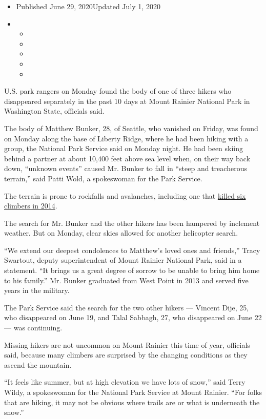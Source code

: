\begin{itemize}
\item
  Published June 29, 2020Updated July 1, 2020
\item
  \begin{itemize}
  \item
  \item
  \item
  \item
  \item
  \end{itemize}
\end{itemize}

U.S. park rangers on Monday found the body of one of three hikers who
disappeared separately in the past 10 days at Mount Rainier National
Park in Washington State, officials said.

The body of Matthew Bunker, 28, of Seattle, who vanished on Friday, was
found on Monday along the base of Liberty Ridge, where he had been
hiking with a group, the National Park Service said on Monday night. He
had been skiing behind a partner at about 10,400 feet above sea level
when, on their way back down, ``unknown events'' caused Mr. Bunker to
fall in ``steep and treacherous terrain,'' said Patti Wold, a
spokeswoman for the Park Service.

The terrain is prone to rockfalls and avalanches, including one that
\href{https://www.nytimes.com/2014/06/02/us/six-climbers-are-missing-on-mount-rainier.html}{killed
six climbers in 2014}.

The search for Mr. Bunker and the other hikers has been hampered by
inclement weather. But on Monday, clear skies allowed for another
helicopter search.

``We extend our deepest condolences to Matthew's loved ones and
friends,'' Tracy Swartout, deputy superintendent of Mount Rainier
National Park, said in a statement. ``It brings us a great degree of
sorrow to be unable to bring him home to his family.'' Mr. Bunker
graduated from West Point in 2013 and served five years in the military.

The Park Service said the search for the two other hikers --- Vincent
Dije, 25, who disappeared on June 19, and Talal Sabbagh, 27, who
disappeared on June 22 --- was continuing.

Missing hikers are not uncommon on Mount Rainier this time of year,
officials said, because many climbers are surprised by the changing
conditions as they ascend the mountain.

``It feels like summer, but at high elevation we have lots of snow,''
said Terry Wildy, a spokeswoman for the National Park Service at Mount
Rainier. ``For folks that are hiking, it may not be obvious where trails
are or what is underneath the snow.''

